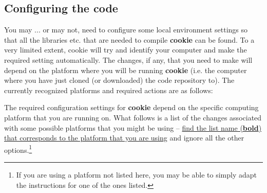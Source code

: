 
\subsection{Configuring the code}

\noindent You may ... or may not, need to configure some local environment settings so that all the libraries etc. that are needed to compile \textbf{cookie} can be found. To a very limited extent, cookie will try and identify your computer and make the required setting automatically. The changes, if any, that you need to make will depend on the platform where you will be running \textbf{cookie} (i.e. the computer where you have just cloned (or downloaded) the code repository to). The currently recognized platforms and required actions are as follows:

\vspace{1mm}
\noindent The required configuration settings for \textbf{cookie} depend on the specific computing platform that you are running on. What follows is a list of the changes associated with some possible platforms that you might be using -- \uline{find the list name (\textbf{bold}) that corresponds to the platform that you are using} and ignore all the other options.\footnote{If you are using a platform not listed here, you may be able to simply adapt the instructions for one of the ones listed.}

\newpage

